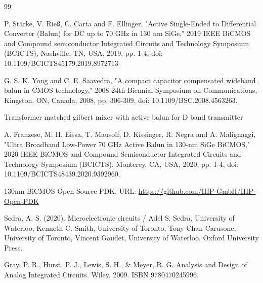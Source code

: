 \begin{thebibliography}{99}

P. Stärke, V. Rieß, C. Carta and F. Ellinger, "Active Single-Ended to Differential Converter (Balun) for DC up to 70 GHz in 130 nm SiGe," 2019 IEEE BiCMOS and Compound semiconductor Integrated Circuits and Technology Symposium (BCICTS), Nashville, TN, USA, 2019, pp. 1-4, doi: 10.1109/BCICTS45179.2019.8972713


G. S. K. Yong and C. E. Saavedra, "A compact capacitor compensated wideband balun in CMOS technology," 2008 24th Biennial Symposium on Communications, Kingston, ON, Canada, 2008, pp. 306-309, doi: 10.1109/BSC.2008.4563263.


Transformer matched gilbert mixer with active balun for D band transmitter


A. Franzese, M. H. Eissa, T. Mausolf, D. Kissinger, R. Negra and A. Malignaggi, "Ultra Broadband Low-Power 70 GHz Active Balun in 130-nm SiGe BiCMOS," 2020 IEEE BiCMOS and Compound Semiconductor Integrated Circuits and Technology Symposium (BCICTS), Monterey, CA, USA, 2020, pp. 1-4, doi: 10.1109/BCICTS48439.2020.9392960.


130nm BiCMOS Open Source PDK.
URL: \url{https://github.com/IHP-GmbH/IHP-Open-PDK}


Sedra, A. S. (2020). Microelectronic circuits / Adel S. Sedra, University of Waterloo, Kenneth C. Smith, University of Toronto, Tony Chan Carusone, University of Toronto, Vincent Gaudet, University of Waterloo. Oxford University Press.

Gray, P. R., Hurst, P. J., Lewis, S. H., \& Meyer, R. G. Analysis and Design of Analog Integrated Circuits. Wiley, 2009. ISBN 9780470245996.



\end{thebibliography}
